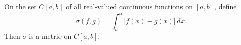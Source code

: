 On the set $C[a, b]$ of all real-valued continuous functions on $[a, b]$, define
$$
\sigma(f, g) = \int_a^b |f(x) - g(x)| \, dx.
$$
Then $\sigma$ is a metric on $C[a, b]$.
